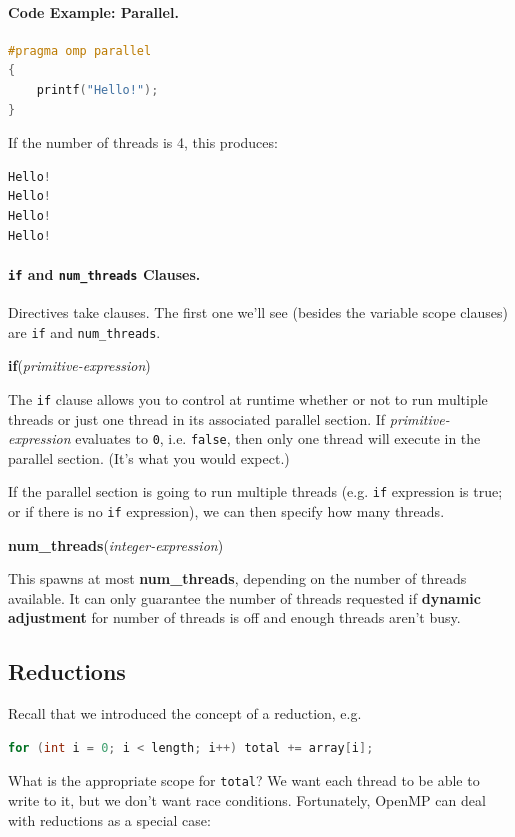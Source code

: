 \documentclass[a4paper]{report}
\begin{document}
\paragraph{Code Example: Parallel.}
  \begin{lstlisting}[language=C]
#pragma omp parallel
{
    printf("Hello!");
}
  \end{lstlisting}

  If the number of threads is 4, this produces:
  \begin{lstlisting}[language=C]
Hello!
Hello!
Hello!
Hello!
  \end{lstlisting}

\paragraph{{\tt if} and {\tt num\_threads} Clauses.} Directives take clauses.
The first one we'll see (besides the variable scope clauses) are {\tt if} and
{\tt num\_threads}.

  \begin{center}
    {\bf if}({\it primitive-expression})    
  \end{center}
The {\tt if} clause allows you to control at runtime whether or not to run
multiple threads or just one thread in its associated parallel section.
If {\it primitive-expression} evaluates to {\tt 0}, i.e. {\tt false}, then
only one thread will execute in the parallel section. (It's what you would expect.)


If the parallel section is going to run multiple threads (e.g. {\tt if} expression
is true; or if there is no {\tt if} expression), we can then specify how many threads.
  \begin{center}
    {\bf num\_threads}({\it integer-expression})    
  \end{center}

This spawns at most {\bf num\_threads}, depending on the number of
threads available.  It can only guarantee the number of threads
requested if {\bf dynamic adjustment} for number of threads is off and
enough threads aren't busy.

\subsection*{Reductions}
Recall that we introduced the concept of a reduction, e.g.
{\small
\begin{lstlisting}[language=C,morekeywords={foreach,pragma,omp,parallel,single,nowait,task,untied,barrier,taskyield}]
  for (int i = 0; i < length; i++) total += array[i];
\end{lstlisting}
}
What is the appropriate scope for {\tt total}? We want each thread
to be able to write to it, but we don't want race conditions.
Fortunately, OpenMP can deal with reductions as a special case:
\end{document}
